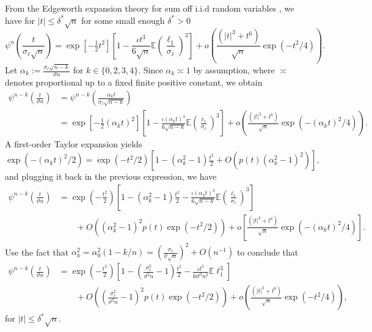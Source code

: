 \documentclass[11pt]{article}
\numberwithin{equation}{section}
\theoremstyle{definition}
\newcommand{\E}{\mathbb{E}}
\newcommand{\Scale}{\vartheta}
\begin{document}
From the Edgeworth expansion theory for sum off i.i.d random variables \citep{Bhattacharya-Rao1976_book,Hall1992_book}, we have for $|t|\leq \delta^*\sqrt{n}$ for some small enough $\delta^*>0$ 
\[\psi^n\left(\frac{t}{\sigma_\ell \sqrt{n}}\right) = \exp\left[-\tfrac{1}{2}t^2\right]\left[1 -\frac{\iota t^3}{6\sqrt{n}}\E \left(\frac{\ell_1}{\sigma_\ell}\right)^3 \right] + o\left(\frac{(|t|^3 + t^6)}{\sqrt{n}}\exp(-t^2/4)\right).\]
Let $\alpha_k:=\frac{\sigma_\ell\sqrt{n-k}}{\Scale n}$ for $k\in\{0,2,3,4\}$. Since $\alpha_k\asymp 1$ by assumption, where $\asymp$ denotes proportional up to a fixed finite positive constant, we obtain
\begin{align*}
    \psi^{n-k}\left(\frac{t}{\Scale n}\right) &=\psi^{n-k}\left(\frac{\alpha_k t}{\sigma_\ell \sqrt{n-k}}\right)\\
    &= \exp\left[-\tfrac{1}{2}\left(\alpha_k t\right)^2\right]\left[1 -\frac{\iota (\alpha_k t)^3}{6\sqrt{n-k}}\E \left(\frac{\ell_1}{\sigma_\ell}\right)^3 \right]  + o\left(\frac{(|t|^3 + t^6)}{\sqrt{n}}\exp(-(\alpha_k t)^2/4)\right).
\end{align*}
A first-order Taylor expansion yields 
\[\exp(-(\alpha_k t)^2/2) = \exp(-t^2/2)\left[1 - (\alpha^2_k-1)\tfrac{t^2}{2} + O(p(t) (\alpha^2_k-1)^2)\right],\]
and plugging it back in the previous expression, we have
\begin{align*}
    \psi^{n-k}\left(\frac{t}{\Scale n}\right) 
    &= \exp\left(-\tfrac{t^2}{2}\right)\left[1 - (\alpha^2_k-1)\frac{t^2}{2} -\frac{\iota (\alpha_k t)^3}{6\sqrt{n-k}}\E \left(\frac{\ell_1}{\sigma_\ell}\right)^3 \right]  \\
    &\qquad + O\left( (\alpha_k^2 -1)^2p(t)\exp{(-t^2/2)}\right) + o\left[\frac{(|t|^3 + t^6)}{\sqrt{n}}\exp(-(\alpha_k t)^2/4)\right].
\end{align*}
Use the fact that $\alpha_k^2 =\alpha_0^2(1-k/n)=\left(\frac{\sigma_\ell}{\Scale \sqrt{n}} \right)^2 +O(n^{-1})$ to conclude that
\begin{align}\label{E:iid_EE}
    \psi^{n-k}\left(\frac{t}{\Scale n}\right) 
    &= \exp\left(-\tfrac{t^2}{2}\right)\left[1 - \left(\tfrac{\sigma_\ell^2}{\Scale^2 n}-1\right)\frac{t^2}{2} -\frac{\iota t^3}{6\Scale^3n^2}\E \ell_1^3 \right] \nonumber \\
    &\qquad + O\left( \left(\tfrac{\sigma_\ell^2}{\Scale^2 n} -1\right)^2p(t)\exp{(-t^2/2)}\right) + o\left(\frac{(|t|^3 + t^6)}{\sqrt{n}}\exp(- t^2/4)\right),
\end{align}
for $|t|\leq \delta^*\sqrt{n}$.
\end{document}
